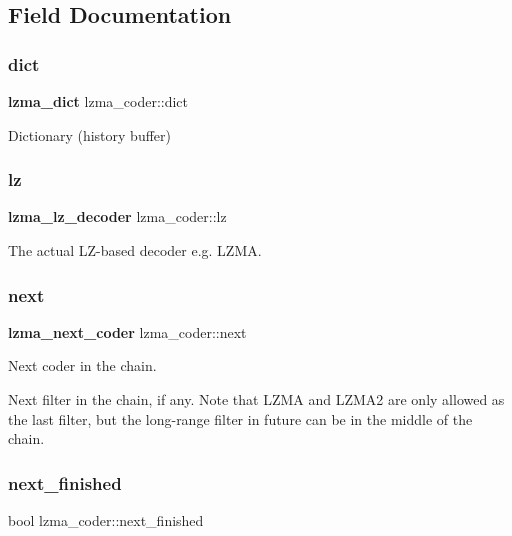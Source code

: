 \subsection{Field Documentation}
\mbox{\label{structlzma__coder_a9b71c6b7424b041a59152060c4670488}} 
\subsubsection{dict}
{\footnotesize\ttfamily \textbf{ lzma\+\_\+dict} lzma\+\_\+coder\+::dict}



Dictionary (history buffer) 

\mbox{\label{structlzma__coder_abc772f1ec88632afa84c9af7490f474b}} 
\subsubsection{lz\hspace{0.1cm}{\footnotesize\ttfamily [1/2]}}
{\footnotesize\ttfamily \textbf{ lzma\+\_\+lz\+\_\+decoder} lzma\+\_\+coder\+::lz}



The actual L\+Z-\/based decoder e.\+g. L\+Z\+MA. 

\mbox{\label{structlzma__coder_a3b1b1d9528e2d3042826bd805fea42d2}} 
\subsubsection{next}
{\footnotesize\ttfamily \textbf{ lzma\+\_\+next\+\_\+coder} lzma\+\_\+coder\+::next}



Next coder in the chain. 

Next filter in the chain, if any. Note that L\+Z\+MA and L\+Z\+M\+A2 are only allowed as the last filter, but the long-\/range filter in future can be in the middle of the chain. \mbox{\label{structlzma__coder_afb0adcd0e66adaa34ec24df7a3a40cbc}} 
\subsubsection{next\+\_\+finished}
{\footnotesize\ttfamily bool lzma\+\_\+coder\+::next\+\_\+finished}



